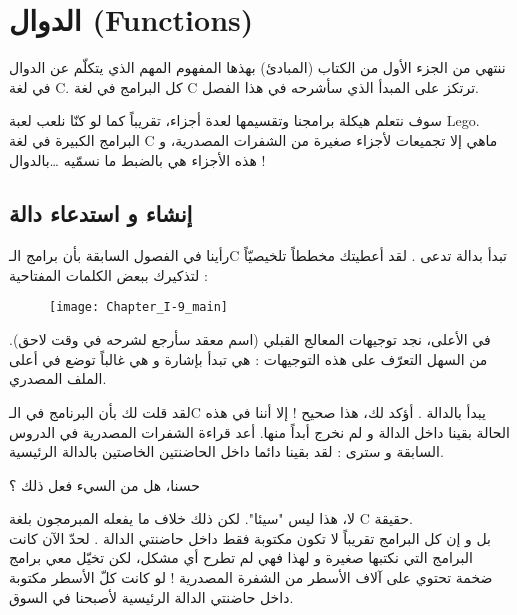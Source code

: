 \chapter{الدوال (\textenglish{Functions})}

ننتهي من الجزء الأول من الكتاب (المبادئ) بهذها المفهوم المهم الذي يتكلّم عن الدوال في لغة
\textenglish{C}.
كل البرامج في لغة  
\textenglish{C}
ترتكز على المبدأ الذي سأشرحه في هذا الفصل.

سوف نتعلم هيكلة برامجنا وتقسيمها لعدة أجزاء، تقريباً كما لو كنّا نلعب لعبة
\textenglish{Lego}.\\
البرامج الكبيرة في لغة 
\textenglish{C}
ماهي إلا تجميعات لأجزاء صغيرة من الشفرات المصدرية، و هذه الأجزاء هي بالضبط ما نسمّيه \dots بالدوال !

\section{إنشاء و استدعاء دالة}

رأينا في الفصول السابقة بأن برامج الـ\textenglish{C}
تبدأ بدالة تدعى 
.
لقد أعطيتك مخططاً تلخيصيّاً لتذكيرك ببعض الكلمات المفتاحية :

\begin{figure}[H]
	\centering
	\texttt{[image: Chapter\_I-9\_main]}
\end{figure}

في الأعلى، نجد توجيهات المعالج القبلي (اسم معقد سأرجع لشرحه في وقت لاحق). من السهل التعرّف على هذه التوجيهات : هي تبدأ بإشارة 
\InlineCode{\#}
و هي غالباً توضع في أعلى الملف المصدري.

لقد قلت لك بأن البرنامج في الـ\textenglish{C}
يبدأ بالدالة
.
 أؤكد لك، هذا صحيح ! إلا أننا في هذه الحالة بقينا داخل الدالة 
و لم نخرج أبداً منها. أعد قراءة الشفرات المصدرية في الدروس السابقة و سترى : لقد بقينا دائما داخل الحاضنتين الخاصتين بالدالة الرئيسية.

\begin{question}
حسنا، هل من السيء فعل ذلك ؟
\end{question}

لا، هذا ليس "سيئا". لكن ذلك خلاف ما يفعله المبرمجون بلغة
\textenglish{C}
حقيقة.\\
بل و إن كل البرامج تقريباً لا تكون مكتوبة فقط داخل  حاضنتي الدالة 
.
لحدّ الآن كانت البرامج التي نكتبها صغيرة و لهذا فهي لم تطرح أي مشكل، لكن تخيّل معي برامج ضخمة تحتوي على آلاف الأسطر من الشفرة المصدرية ! لو كانت كلّ الأسطر مكتوبة داخل حاضنتي الدالة الرئيسية لأصبحنا في السوق.

